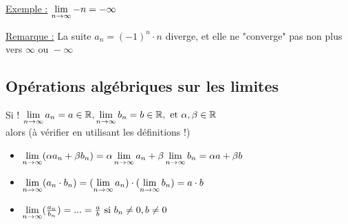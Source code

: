 \documentclass[12pt,a4paper]{article}
\begin{document}
{\underline{Exemple :} $\lim\limits_{n \to \infty} -n = -\infty$

\begin{center}
\end{center}

\underline{Remarque :} La suite $a_n = (-1)^n \cdot n$ diverge, et elle ne "converge" pas non plus vers $\infty \text{ ou }-\infty$

\subsection{Opérations algébriques sur les limites}
Si ! $\lim\limits_{n \to \infty} a_n = a\in \mathbb{R}, \lim\limits_{n \to \infty} b_n = b \in \mathbb{R}, \text{ et } \alpha, \beta \in \mathbb{R}$\\
alors (à vérifier en utilisant les définitions !)\\

\begin{itemize}
\item $\lim\limits_{n \to \infty} (\alpha a_n + \beta b_n) = \alpha \lim\limits_{n \to \infty} a_n + \beta \lim\limits_{n \to \infty} b_n = \alpha a + \beta b$
\item $\lim\limits_{n \to \infty} (a_n \cdot b_n) = (\lim\limits_{n \to \infty} a_n) \cdot (\lim\limits_{n \to \infty}b_n) = a\cdot b$
\item $\lim\limits_{n \to \infty}(\frac{a_n}{b_n}) = ... = \frac{a}{b} \text{ si } b_n \neq 0, b \neq 0$
\end{itemize}

}
\end{document}
